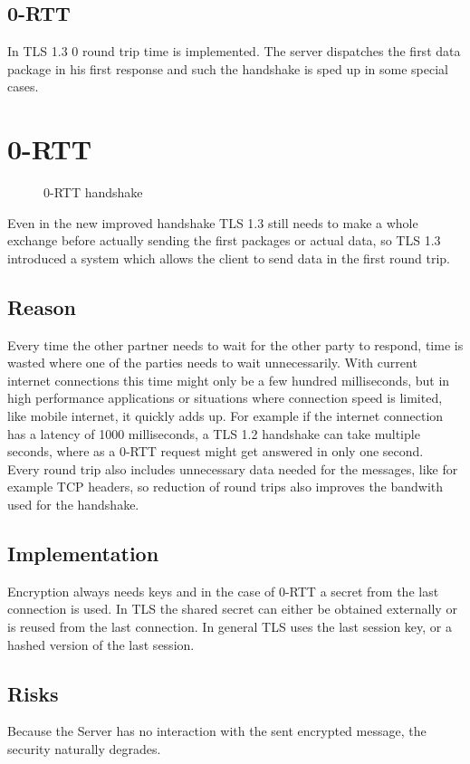 \documentclass[a4paper,conference]{IEEEtran}
\begin{document}
\subsection{0-RTT}
In TLS 1.3 0 round trip time is implemented. The server dispatches the first data package in his first response and such the handshake is sped up in some special cases. 
\section{0-RTT}
\begin{figure}
  
  \caption{0-RTT handshake}
\end{figure}
Even in the new improved handshake TLS 1.3 still needs to make a whole exchange before actually sending the first packages or actual data, so TLS 1.3 introduced a system which allows the client to send data in the first round trip.\\
\subsection{Reason}
Every time the other partner needs to wait for the other party to respond, time is wasted where one of the parties needs to wait unnecessarily. With current internet connections this time might only be a few hundred milliseconds, but in high performance applications or situations where connection speed is limited, like mobile internet, it quickly adds up. For example if the internet connection has a latency of 1000 milliseconds, a TLS 1.2 handshake can take multiple seconds, where as a 0-RTT request might get answered in only one second.\\
Every round trip also includes unnecessary data needed for the messages, like for example TCP headers, so reduction of round trips also improves the bandwith used for the handshake.
\subsection{Implementation}
Encryption always needs keys and in the case of 0-RTT a secret from the last connection is used.
In TLS the shared secret can either be obtained externally or is reused from the last connection\cite{rfc8446}.
In general TLS uses the last session key, or a hashed version of the last session.
\subsection{Risks}
Because the Server has no interaction with the sent encrypted message, the security naturally degrades.
\end{document}
